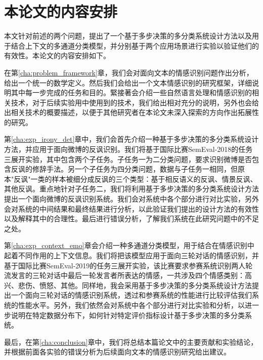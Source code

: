 \section{本论文的内容安排}

本文针对前述的两个问题，提出了一个基于多步决策的多分类系统设计方法以及用于结合上下文的多通道分类模型，并分别基于两个应用场景进行实验以验证他们的有效性。本论文的内容安排如下。

在第\ref{cha:problem_framework}章，我们会对面向文本的情感识别问题作出分析，给出一个统一的数学定义。然后我们会给出一个文本情感识别的研究框架，详细说明其中每一步完成的任务和目的。緊接著会介绍一些自然语言处理和情感识别的相关技术，对于后续实验用中使用到的技术，我们给出相对充分的说明，另外也会给出相关技术的概要描述，以便于其他研究者在本论文未深入探索的方向作出拓展性的研究。

第\ref{cha:exp_irony_det}章中，我们会首先介绍一种基于多步决策的多分类系统设计方法，并应用于面向微博的反讽识别。我们将基于国际比赛SemEval-2018的任务三\cite{van2018semeval}展开实验，其中包含两个子任务。子任务一为二分类问题，要求识别微博是否包含反讽的修辞手法。另一个子任务为四分类问题，数据与子任务一相同，但原本"反讽"一类的样本被细分成反讽的三个类型：基于相反语义的反讽、情景反讽、其他反讽。重点地针对子任务二，我们将利用基于多步决策的多分类系统设计方法提出一个面向微博的反讽识别系统。我们会对系统中各个部分进行对比实验，另外会对系统的中间结果和最终结果进行分析，以此验证我们提出的设计方法的有效性以及解释其中的合理性。最后进行错误分析，了解我们系统在此研究问题中的不足之处。

第\ref{cha:exp_context_emo}章会介绍一种多通道分类模型，用于结合在情感识别中起着不同作用的上下文信息。我们将把该模型应用于面向三轮对话的情感识别，并基于国际比赛SemEval-2019的任务三\cite{SemEval2019Task3}展开实验，该比赛要求参赛系统识别两人轮流发言的三轮对话中最后一轮发言者所表达的情感，一共涉及四个情感类别：高兴、悲伤、愤怒、其他。同样地，我会采用基于多步决策的多分类系统设计方法提出一个面向三轮对话的情感识别系统，透过和参赛系统的性能进行比较评估我们系统的性能水平。另外，我们依然会对系统中各个部分进行对比实验和分析，以进一步说明在特定数据分布下，如何针对特定评价指标设计基于多步决策的多分类系统。

最后，在第\ref{cha:conclusion}章中，我们将总结本篇论文中的主要贡献和实验结论，并根据前面各实验的错误分析为后续面向文本的情感识别研究给出建议。












